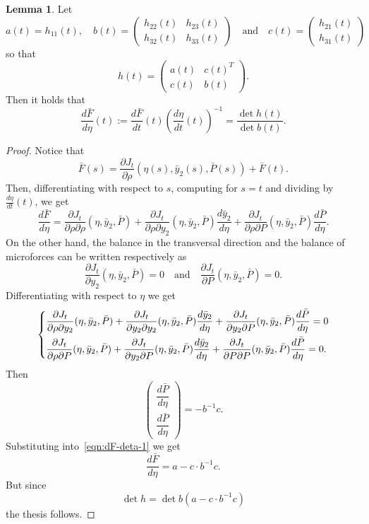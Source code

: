 \documentclass[a4paper,10pt,oneside]{amsbook}
\numberwithin{section}{chapter}
\numberwithin{equation}{chapter}
\theoremstyle{definition}
\newtheorem{lemma}[prop]{Lemma}
\newcommand{\dind}[2]{\frac{\partial #1}{\partial #2}}
\begin{document}
\begin{lemma}
\label{lemma:stability-force}
Let
\[
a(t)=h_{11}(t),\quad
b(t)=\begin{pmatrix}
h_{22}(t) & h_{23}(t) \\
h_{32}(t) & h_{33}(t)
\end{pmatrix}\quad\text{and}\quad
c(t)=\begin{pmatrix}
h_{21}(t) \\
h_{31}(t)
\end{pmatrix}
\]
so that
\[
h(t)=\begin{pmatrix}
a(t) & c(t)^T \\
c(t) & b(t)
\end{pmatrix}.
\]
Then it holds that
\[
\frac{d\bar F}{d\eta}(t):=\frac{d\bar F}{dt}(t)\left(\frac{d\eta}{dt}(t)\right)^{-1}=\frac{\det h(t)}{\det b(t)}.
\]
\end{lemma}
\begin{proof}
Notice that
\[
\bar F(s)=\dind{J_t}{\rho}(\eta(s),\bar y_2(s),\bar P(s))+\bar{F}(t).
\]
Then, differentiating with respect to $s$, computing for $s=t$ and dividing by $\frac{d\eta}{dt}(t)$, we get
\begin{equation}
\label{eqn:dF-deta-1}
\frac{d\bar F}{d\eta}=\dind{J_t}{\rho\partial\rho}(\eta,\bar y_2,\bar P)+\dind{J_t}{\rho\partial y_2}(\eta,\bar y_2,\bar P)\frac{d\bar y_2}{d\eta}+\dind{J_t}{\rho\partial P}(\eta,\bar y_2,\bar P)\frac{d\bar P}{d\eta}.
\end{equation}
On the other hand, the balance in the transversal direction and the balance of microforces can be written respectively as
\[
\dind{J_t}{y_2}(\eta,\bar y_2,\bar P)=0\quad\text{and}\quad\dind{J_t}{P}(\eta,\bar y_2,\bar P)=0.
\]
Differentiating with respect to $\eta$ we get
\[
\begin{dcases}
\dind{J_t}{\rho\partial y_2}(\eta,\bar y_2,\bar P)+\dind{J_t}{y_2\partial y_2}(\eta,\bar y_2,\bar P)\frac{d\bar y_2}{d\eta}+\dind{J_t}{y_2\partial P}(\eta,\bar y_2,\bar P)\frac{d\bar P}{d\eta}=0 \\
\dind{J_t}{\rho\partial P}(\eta,\bar y_2,\bar P)+\dind{J_t}{y_2\partial P}(\eta,\bar y_2,\bar P)\frac{d\bar y_2}{d\eta}+\dind{J_t}{P\partial P}(\eta,\bar y_2,\bar P)\frac{d\bar P}{d\eta}=0.
\end{dcases}
\]
Then
\[
\begin{pmatrix}
\dfrac{d\bar P}{d\eta} \\
\dfrac{d\bar P}{d\eta}
\end{pmatrix}=
-b^{-1} c.
\]
Substituting into~\eqref{eqn:dF-deta-1} we get
\[
\frac{d\bar F}{d\eta}=a-c\cdot b^{-1}c.
\]
But since
\[
\det h=\det b\left(a-c\cdot b^{-1}c\right)
\]
the thesis follows.
\end{proof}
\end{document}
